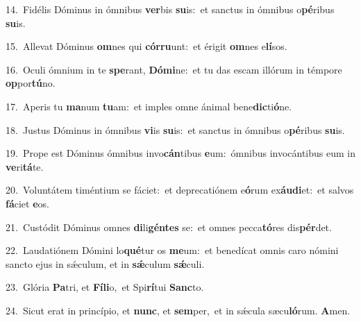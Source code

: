 {\numbfont\textcolor{\numbcolor}{14.}}~Fidélis Dóminus in ómnibus \textbf{ver}\-bis \textbf{su}\-is:~\star et sanctus in ómnibus o\-\textbf{pé}\-ribus \textbf{su}\-is.\par
{\numbfont\textcolor{\numbcolor}{15.}}~Allevat Dóminus \textbf{om}\-nes qui \textbf{cór}\-\textbf{ru}unt:~\star et érigit \textbf{om}\-nes e\-\textbf{lí}\-sos.\par
{\numbfont\textcolor{\numbcolor}{16.}}~Oculi ómnium in te \textbf{spe}\-rant, \textbf{Dó}\-\textbf{mi}ne:~\star et tu das escam illórum in témpore \textbf{op}\-por\-\textbf{tú}\-no.\par
{\numbfont\textcolor{\numbcolor}{17.}}~Aperis tu \textbf{ma}\-num \textbf{tu}\-am:~\star et imples omne ánimal bene\-\textbf{dic}\-ti\-\textbf{ó}\-ne.\par
{\numbfont\textcolor{\numbcolor}{18.}}~Justus Dóminus in ómnibus \textbf{vi}\-is \textbf{su}\-is:~\star et sanctus in ómnibus o\-\textbf{pé}\-ribus \textbf{su}\-is.\par
{\numbfont\textcolor{\numbcolor}{19.}}~Prope est Dóminus ómnibus invo\-\textbf{cán}\-tibus \textbf{e}\-um:~\star ómnibus invocántibus eum in \textbf{ve}\-ri\-\textbf{tá}\-te.\par
{\numbfont\textcolor{\numbcolor}{20.}}~Voluntátem timéntium se fáciet:~\dagger et deprecatiónem e\-\textbf{ó}\-rum ex\-\textbf{áu}\-\textbf{di}et:~\star et salvos \textbf{fá}\-ciet \textbf{e}\-os.\par
{\numbfont\textcolor{\numbcolor}{21.}}~Custódit Dóminus omnes \textbf{di}\-li\-\textbf{gén}\-\textbf{tes} se:~\star et omnes pecca\-\textbf{tó}\-res dis\-\textbf{pér}\-det.\par
{\numbfont\textcolor{\numbcolor}{22.}}~Laudatiónem Dómini lo\-\textbf{qué}\-tur os \textbf{me}\-um:~\star et benedícat omnis caro nómini sancto ejus in sǽculum, et in \textbf{sǽ}\-culum \textbf{sǽ}\-culi.\par
{\numbfont\textcolor{\numbcolor}{23.}}~Glória \textbf{Pa}\-tri, et \textbf{Fí}\-\textbf{li}o,~\star et Spi\-\textbf{rí}\-tui \textbf{Sanc}\-to.\par
{\numbfont\textcolor{\numbcolor}{24.}}~Sicut erat in princípio, et \textbf{nunc}\-, et \textbf{sem}\-per,~\star et in sǽcula sæcu\-\textbf{ló}\-rum. \textbf{A}\-men.\par
